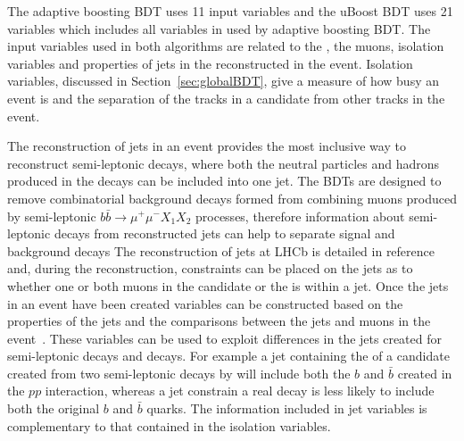 The adaptive boosting BDT uses 11 input variables and the uBoost BDT uses 21 variables which includes all variables in used by adaptive boosting BDT.
The input variables used in both algorithms are related to the \bs, the muons, isolation variables and properties of jets in the reconstructed in the event. Isolation variables, discussed in Section~\ref{sec:globalBDT}, give a measure of how busy an event is and the separation of the tracks in a \bsmumu candidate from other tracks in the event. 

The reconstruction of jets in an event provides the most inclusive way to reconstruct semi-leptonic decays, where both the neutral particles and hadrons produced in the decays can be included into one jet. 
The BDTs are designed to remove combinatorial background decays formed from combining muons produced by semi-leptonic $b\bar{b} \to \mu^{+} \mu^{-} X_{1} X_{2}$ processes, therefore information about semi-leptonic decays from reconstructed jets can help to separate signal and background decays
The reconstruction of jets at LHCb is detailed in reference~\cite{Augusto:1499646} and, during the reconstruction, constraints can be placed on the jets as to whether one or both muons in the \bsmumu candidate or the \bs is within a jet. 
Once the jets in an event have been created variables can be constructed based on the properties of the jets and the comparisons between the jets and muons in the event~\cite{CidVidal:2025971}. These variables can be used to exploit differences in the jets created for semi-leptonic decays and \bsmumu decays. For example a jet containing the \bs of a \bsmumu candidate created from two semi-leptonic decays by \bbbarmumux will include both the $b$ and $\bar{b}$ created in the $pp$ interaction, whereas a jet constrain a real \bsmumu decay is less likely to include both the original $b$ and $\bar{b}$ quarks. The information included in jet variables is complementary to that contained in the isolation variables.



